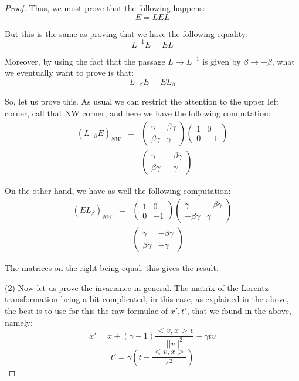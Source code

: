 \documentclass[12pt]{amsbook}
\begin{document}
\begin{proof}
Thus, we must prove that the following happens:
$$E=LEL$$

But this is the same as proving that we have the following equality:
$$L^{-1}E=EL$$

Moreover, by using the fact that the passage $L\to L^{-1}$ is given by $\beta\to-\beta$, what we eventually want to prove is that:
$$L_{-\beta}E=EL_\beta$$

So, let us prove this. As usual we can restrict the attention to the upper left corner, call that NW corner, and  here we have the following computation:
\begin{eqnarray*}
(L_{-\beta}E)_{NW}
&=&\begin{pmatrix}\gamma&\beta\gamma\\ \beta\gamma&\gamma\end{pmatrix}
\begin{pmatrix}1&0\\ 0&-1\end{pmatrix}\\
&=&\begin{pmatrix}\gamma&-\beta\gamma\\ \beta\gamma&-\gamma\end{pmatrix}
\end{eqnarray*}

On the other hand, we have as well the following computation:
\begin{eqnarray*}
(EL_\beta)_{NW}
&=&\begin{pmatrix}1&0\\ 0&-1\end{pmatrix}
\begin{pmatrix}\gamma&-\beta\gamma\\ -\beta\gamma&\gamma\end{pmatrix}\\
&=&\begin{pmatrix}\gamma&-\beta\gamma\\ \beta\gamma&-\gamma\end{pmatrix}
\end{eqnarray*}

The matrices on the right being equal, this gives the result.

\medskip

(2) Now let us prove the invariance in general. The matrix of the Lorentz transformation being a bit complicated, in this case, as explained in the above, the best is to use for this the raw formulae of $x',t'$, that we found in the above, namely:
$$x'=x+(\gamma-1)\frac{<v,x>v}{||v||^2}-\gamma tv$$
$$t'=\gamma\left(t-\frac{<v,x>}{c^2}\right)$$


\end{proof}
\end{document}
